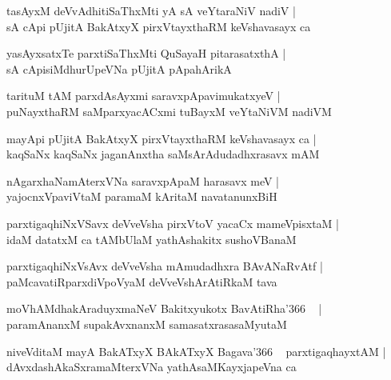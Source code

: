 \documentclass[twoside,12pt,openright]{book}
\newcounter{shloka}[chapter]
\begin{document}
\begin{shloka}%
tasAyxM deVvAdhitiSaThxMti yA sA veYtaraNiV nadiV |\\
sA cApi pUjitA BakAtxyX pirxVtayxthaRM keVshavasayx ca
\end{shloka}

\begin{shloka}%
yasAyxsatxTe parxtiSaThxMti QuSayaH pitarasatxthA |\\
sA cApisiMdhurUpeVNa pUjitA pApahArikA 
\end{shloka}

\begin{shloka}%
tarituM tAM parxdAsAyxmi saravxpApavimukatxyeV |\\
puNayxthaRM saMparxyacACxmi tuBayxM veYtaNiVM nadiVM 
\end{shloka}

\begin{shloka}%
mayApi pUjitA BakAtxyX pirxVtayxthaRM keVshavasayx ca |\\
kaqSaNx kaqSaNx jaganAnxtha saMsArAdudadhxrasavx mAM 
\end{shloka}

\begin{shloka}%
nAgarxhaNamAterxVNa saravxpApaM harasavx meV |\\
yajocnxVpaviVtaM paramaM kAritaM navatanunxBiH
\end{shloka}

\begin{shloka}%
parxtigaqhiNxVSavx deVveVsha pirxVtoV yacaCx mameVpisxtaM |\\
idaM datatxM ca tAMbUlaM yathAshakitx sushoVBanaM
\end{shloka}

\begin{shloka}%
parxtigaqhiNxVsAvx deVveVsha mAmudadhxra BAvANaRvAtf |\\
paMcavatiRparxdiVpoVyaM deVveVshArAtiRkaM tava
\end{shloka}

\begin{shloka}%
moVhAMdhakAraduyxmaNeV Bakitxyukotx BavAtiRha\char'366 ~ |\\
paramAnanxM supakAvxnanxM samasatxrasasaMyutaM 
\end{shloka}

\begin{shloka}%
niveVditaM mayA BakATxyX BAkATxyX Bagava\char'366 ~ parxtigaqhayxtAM |\\
dAvxdashAkaSxramaMterxVNa yathAsaMKayxjapeVna ca
\end{shloka}
\end{document}
